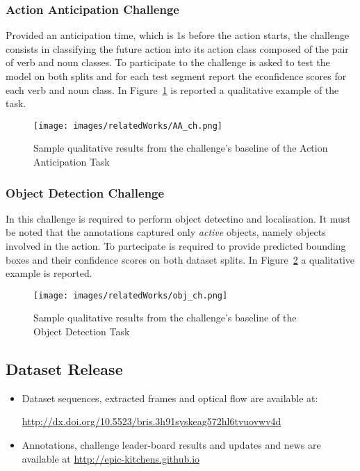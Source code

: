 \subsubsection{Action Anticipation Challenge}\label{sec:ep_AA_chall}
Provided an anticipation time, which is 1s before the action starts,
the challenge consists in classifying the future action into its action class
composed of the pair of verb and noun classes. To participate to the challenge is asked to test the model
on both splits and for each test segment report the econfidence 
scores for each verb and noun class. In Figure~\ref{fig:epic_aa_chall} is reported
a qualitative example of the task.
\begin{figure}
    \centering
    \texttt{[image: images/relatedWorks/AA\_ch.png]} 
    \caption{Sample qualitative results from the challenge's baseline of the Action Anticipation Task}\label{fig:epic_aa_chall}
\end{figure}

 \subsubsection{Object Detection Challenge}
In this challenge is required to perform object detectino and localisation.
It must be noted that the annotations captured only \textit{active} objects, namely
objects involved in the action. To partecipate is required to provide predicted
bounding boxes and their confidence scores on both dataset splits. In Figure~\ref{fig:epic_od_chall}
a qualitative example is reported.

\begin{figure}
    \centering
    \texttt{[image: images/relatedWorks/obj\_ch.png]} 
    \caption{Sample qualitative results from the challenge's baseline of the Object Detection Task}\label{fig:epic_od_chall}
\end{figure}

\subsection{Dataset Release}
\begin{itemize}
    \item Dataset sequences, extracted frames and optical flow are available at:
    
    \url{http://dx.doi.org/10.5523/bris.3h91syskeag572hl6tvuovwv4d}
    \item Annotations, challenge leader-board results and updates and news are available
    at \url{http://epic-kitchens.github.io}
\end{itemize}

